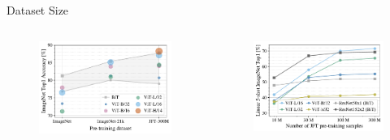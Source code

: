 \begin{frame}{Dataset Size}
    \begin{columns}
        \begin{column}{0.5\textwidth}
            \begin{figure}
                \centering
                \includegraphics[width=\textwidth]{pic/transvolution-i1k-scaling}
                \label{fig:transvolution}
            \end{figure}
        \end{column}
        \begin{column}{0.5\textwidth}
            \begin{figure}
                \centering
                \includegraphics[width=\textwidth]{pic/imagenet_5shot}

\end{figure}
\end{column}
\end{columns}
\end{frame}
